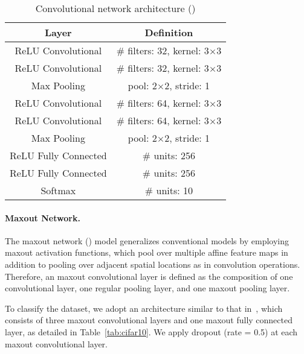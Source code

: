 \begin{table}[h]{\small
  \centering
\begin{tabular}{c|c}
{\bf Layer} & {\bf Definition} \\
\hline
ReLU Convolutional & \# filters: 32, kernel: 3$\times$3   \\
\hline
ReLU Convolutional & \# filters: 32, kernel: 3$\times$3  \\
\hline
Max Pooling & pool: 2$\times$2, stride: 1\\
\hline
ReLU Convolutional & \# filters: 64, kernel: 3$\times$3  \\
\hline
ReLU Convolutional & \# filters: 64, kernel: 3$\times$3  \\
\hline
Max Pooling & pool: 2$\times$2, stride: 1\\
\hline
ReLU Fully Connected & \# units: 256 \\
\hline
ReLU Fully Connected & \# units: 256\\
\hline
Softmax & \# units: 10\\
\hline
\end{tabular}
\caption{Convolutional network architecture (\mnist) \label{tab:mnist} }}
\end{table}

\paragraph*{Maxout Network.\;}
The maxout network (\mxn) model generalizes conventional \cnn models by employing maxout activation functions, which pool over multiple affine feature maps in addition to pooling over adjacent spatial locations as in convolution operations. Therefore, an maxout convolutional layer is defined as the composition of one convolutional layer, one regular pooling layer, and one maxout pooling layer.

To classify the \cifar dataset, we adopt an architecture similar to that in~\cite{Goodfellow:2013:icml}, which consists of three maxout convolutional layers and one maxout fully connected layer, as detailed in Table~\ref{tab:cifar10}. We apply dropout (rate = 0.5) at each maxout convolutional layer.

